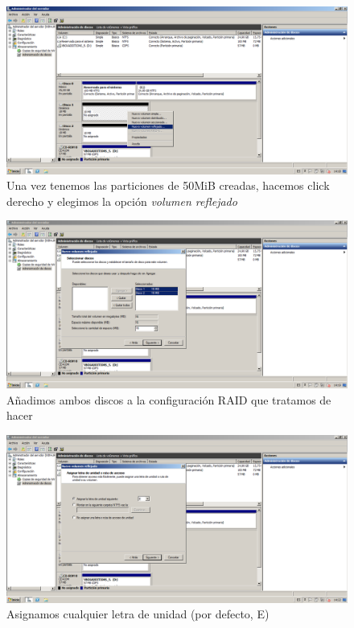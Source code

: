 \begin{figure}[H]
	\centering
	\includegraphics[scale=0.4]{WS2008-1}
	\caption{Una vez tenemos las particiones de 50MiB creadas, hacemos click derecho y elegimos la opción \emph{volumen reflejado}}
	\label{fig:figura3}
\end{figure}

\begin{figure}[H]
	\centering
	\includegraphics[scale=0.4]{WS2008-2}
	\caption{Añadimos ambos discos a la configuración RAID que tratamos de hacer}
	\label{fig:figura4}
\end{figure}

\begin{figure}[H]
	\centering
	\includegraphics[scale=0.4]{WS2008-3}
	\caption{Asignamos cualquier letra de unidad (por defecto, E)}
	\label{fig:figura5}
\end{figure}


